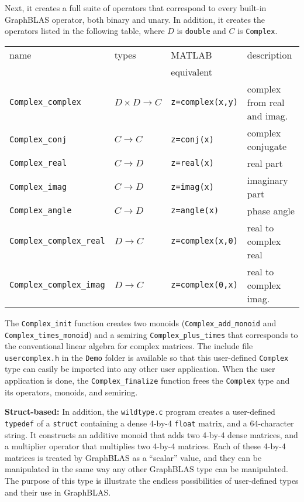 \documentclass[12pt]{article}
\begin{document}
Next, it creates a full suite of operators that correspond to every
built-in GraphBLAS operator, both binary and unary.  In addition, it
creates the operators listed in the following table, where $D$ is
\verb'double' and $C$ is \verb'Complex'.

\vspace{0.1in}
{\footnotesize
\begin{tabular}{llll}
\hline
name                    & types             & MATLAB        & description \\
                        &                   & equivalent    & \\
\hline
\verb'Complex_complex'  & $D \times D \rightarrow C$ & \verb'z=complex(x,y)' & complex from real and imag. \\
\hline
\verb'Complex_conj'     & $C \rightarrow C$ & \verb'z=conj(x)'  & complex conjugate \\
\verb'Complex_real'     & $C \rightarrow D$ & \verb'z=real(x)'  & real part \\
\verb'Complex_imag'     & $C \rightarrow D$ & \verb'z=imag(x)'  & imaginary part \\
\verb'Complex_angle'    & $C \rightarrow D$ & \verb'z=angle(x)' & phase angle \\
\verb'Complex_complex_real'  & $D \rightarrow C$ & \verb'z=complex(x,0)' & real to complex real \\
\verb'Complex_complex_imag'  & $D \rightarrow C$ & \verb'z=complex(0,x)' & real to complex imag. \\
\hline
\end{tabular}
}

The \verb'Complex_init' function creates two monoids (\verb'Complex_add_monoid'
and \verb'Complex_times_monoid') and a semiring \verb'Complex_plus_times' that
corresponds to the conventional linear algebra for complex matrices.  The
include file \verb'usercomplex.h' in the \verb'Demo' folder is available so
that this user-defined \verb'Complex' type can easily be imported into any
other user application.  When the user application is done, the
\verb'Complex_finalize' function frees the \verb'Complex' type and its
operators, monoids, and semiring.

{\bf Struct-based:}
In addition, the \verb'wildtype.c' program  creates a user-defined
\verb'typedef' of a \verb'struct' containing a dense 4-by-4 \verb'float'
matrix, and a 64-character string.  It constructs an additive monoid that adds
two 4-by-4 dense matrices, and a multiplier operator that multiplies two 4-by-4
matrices.  Each of these 4-by-4 matrices is treated by GraphBLAS as a
``scalar'' value, and they can be manipulated in the same way any other
GraphBLAS type can be manipulated. The purpose of this type is illustrate the
endless possibilities of user-defined types and their use in GraphBLAS.
\end{document}
